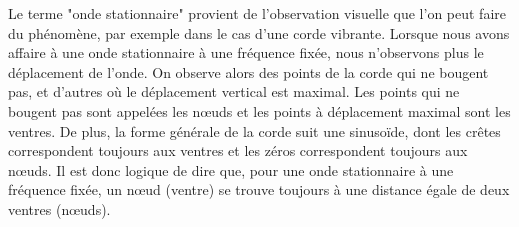 \par Le terme "onde stationnaire" provient de l'observation visuelle que l'on peut faire du phénomène, par exemple dans le cas d'une corde vibrante. Lorsque nous avons affaire à une onde stationnaire à une fréquence fixée, nous n'observons plus le déplacement de l'onde. On observe alors des points de la corde qui ne bougent pas, et d'autres où le déplacement vertical est maximal. Les points qui ne bougent pas sont appelées les nœuds et les points à déplacement maximal sont les ventres. De plus, la forme générale de la corde suit une sinusoïde, dont les crêtes correspondent toujours aux ventres et les zéros correspondent toujours aux nœuds. Il est donc logique de dire que, pour une onde stationnaire à une fréquence fixée, un nœud (ventre) se trouve toujours à une distance égale de deux ventres (nœuds).
